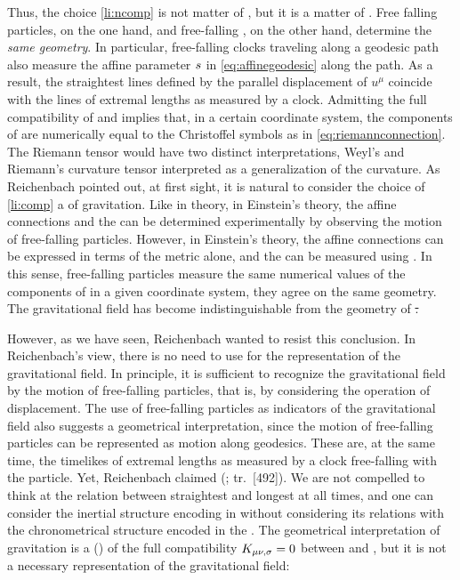 \documentclass[submitted]{article}
\newcommand{\til}{timelike\xspace}
\renewcommand{\rzlap}[2]{(\cite[#1]{Reichenbach1928}; tr.\ [#2])\xspace}
\begin{document}

Thus, the choice \cref{li:ncomp} is not matter of , but it is a matter of  \cite[see][\S2]{Reichenbach1924}. Free falling particles, on the one hand, and free-falling \rac, on the other hand, determine the \emph{same geometry}. In particular, free-falling clocks traveling along a geodesic path also measure the affine parameter $s$ in \cref{eq:affinegeodesic} along the path. As a result, the straightest lines defined by the parallel displacement of $u^\mu$ coincide with the lines of extremal lengths as measured by a clock. Admitting the full compatibility of \gmn and \Gtmn implies that, in a certain coordinate system, the components of \Gtmn are numerically equal to the Christoffel symbols as in \cref{eq:riemannconnection}. The Riemann tensor would have two distinct interpretations, Weyl's  \ritea and Riemann's curvature tensor \riteg interpreted as a generalization of the  curvature. As Reichenbach pointed out, at first sight, it is natural to consider the choice of \cref{li:comp} a  of gravitation. Like in  theory, in Einstein's theory, the affine connections and the \ritea can be determined experimentally by observing the motion of free-falling particles. However, in Einstein's theory, the affine connections \Gtmn can be expressed in terms of the metric \gmn alone, and the \riteg can be measured using \rac. In this sense, free-falling particles measure the same numerical values of the components of \rite in a given coordinate system, \ie they agree on the same geometry. The gravitational field has become indistinguishable from the geometry of \st.

However, as we have seen, Reichenbach wanted to resist this conclusion. In Reichenbach's view, there is no need to use \rac for the representation of the gravitational field. In principle, it is sufficient to recognize the gravitational field by the motion of free-falling particles, that is, by considering the operation of displacement. The use of free-falling particles as indicators of the gravitational field also suggests a geometrical interpretation, since the motion of free-falling particles can be represented as motion along geodesics. These are, at the same time, the \til \wl{}s of extremal lengths as measured by a clock free-falling with the particle. Yet, Reichenbach claimed  \rzlap{353}{492}. We are not compelled to think at the relation between straightest and longest \wl{} at all times, and one can consider the inertial structure encoding in \Gtmn without considering its relations with the chronometrical structure encoded in the \gmn. The geometrical interpretation of gravitation is a  () of the full compatibility $K_{\mu \nu, \sigma}=0$ between \gmn and \Gtmn, but it is not a necessary representation of the gravitational field:
\end{document}

